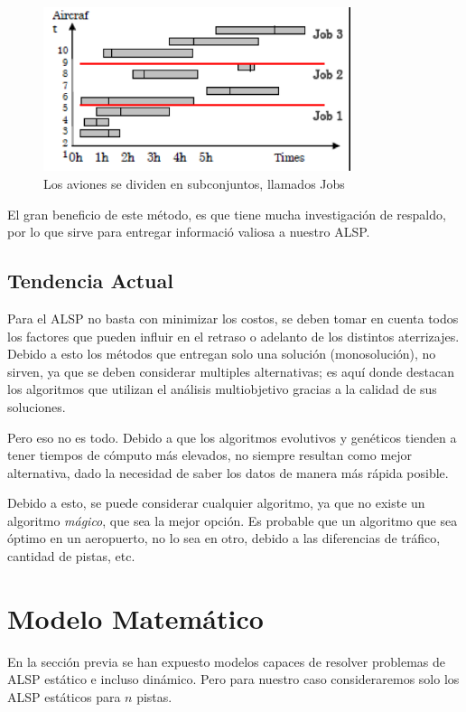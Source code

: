 \documentclass[letter, 11pt]{article}
\begin{document}
\begin{figure}[!h]
\centering
\includegraphics[width=9cm]{job-shop.png}
\centering
\caption{Los aviones se dividen en subconjuntos, llamados Jobs}
\end{figure}

El gran beneficio de este método, es que tiene mucha investigación de respaldo, por lo que sirve para entregar informació valiosa a nuestro ALSP.




\subsection{Tendencia Actual}
Para el ALSP no basta con minimizar los costos, se deben tomar en cuenta todos los factores que pueden influir en el retraso o adelanto de los distintos aterrizajes. Debido a esto los métodos que entregan solo una solución (monosolución), no sirven, ya que se deben considerar multiples alternativas; es aquí donde destacan los algoritmos que utilizan el análisis multiobjetivo gracias a la calidad de sus soluciones.

Pero eso no es todo. Debido a que los algoritmos evolutivos y genéticos tienden a tener tiempos de cómputo más elevados, no siempre resultan como mejor alternativa, dado la necesidad de saber los datos de manera más rápida posible.

Debido a esto, se puede considerar cualquier algoritmo, ya que no existe un algoritmo \textit{mágico}, que sea la mejor opción. Es probable que un algoritmo que sea óptimo en un aeropuerto, no lo sea en otro, debido a las diferencias de tráfico, cantidad de pistas, etc.

\section{Modelo Matem\'atico}
En la sección previa se han expuesto modelos capaces de resolver problemas de ALSP estático e incluso dinámico. Pero para nuestro caso consideraremos solo los ALSP estáticos para $n$ pistas.
\end{document}
